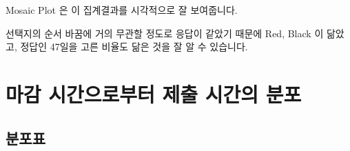 \documentclass[
]{book}
\begin{document}
Mosaic Plot 은 이 집계결과를 시각적으로 잘 보여줍니다.

선택지의 순서 바꿈에 거의 무관할 정도로 응답이 같았기 때문에 Red, Black 이 닮았고, 정답인 47일을 고른 비율도 닮은 것을 잘 알 수 있습니다.

\section{마감 시간으로부터 제출 시간의 분포}\label{uxb9c8uxac10-uxc2dcuxac04uxc73cuxb85cuxbd80uxd130-uxc81cuxcd9c-uxc2dcuxac04uxc758-uxbd84uxd3ec-7}

\subsection{분포표}\label{uxbd84uxd3ecuxd45c-8}
\end{document}
